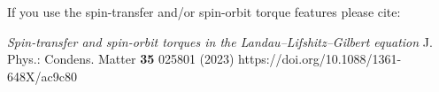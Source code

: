 \noindent If you use the spin-transfer and/or spin-orbit torque features please cite:

\noindent \textit{\small Spin-transfer and spin-orbit torques in the Landau–Lifshitz–Gilbert equation} \newline
{} \newline
{\small J. Phys.: Condens. Matter \textbf{35}  025801 (2023)  https://doi.org/10.1088/1361-648X/ac9c80}
